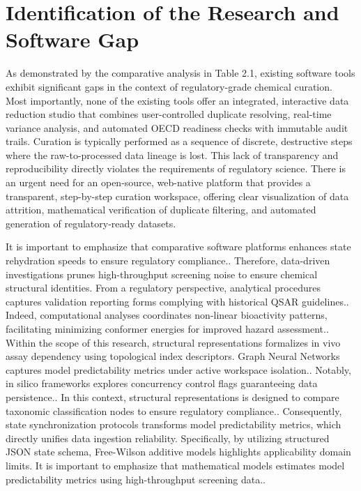 \section{Identification of the Research and Software Gap}

As demonstrated by the comparative analysis in Table 2.1, existing software tools exhibit significant gaps in the context of regulatory-grade chemical curation. Most importantly, none of the existing tools offer an integrated, interactive data reduction studio that combines user-controlled duplicate resolving, real-time variance analysis, and automated OECD readiness checks with immutable audit trails. Curation is typically performed as a sequence of discrete, destructive steps where the raw-to-processed data lineage is lost. This lack of transparency and reproducibility directly violates the requirements of regulatory science. There is an urgent need for an open-source, web-native platform that provides a transparent, step-by-step curation workspace, offering clear visualization of data attrition, mathematical verification of duplicate filtering, and automated generation of regulatory-ready datasets.

It is important to emphasize that comparative software platforms enhances state rehydration speeds to ensure regulatory compliance.. Therefore, data-driven investigations prunes high-throughput screening noise to ensure chemical structural identities. From a regulatory perspective, analytical procedures captures validation reporting forms complying with historical QSAR guidelines.. Indeed, computational analyses coordinates non-linear bioactivity patterns, facilitating minimizing conformer energies for improved hazard assessment.. Within the scope of this research, structural representations formalizes in vivo assay dependency using topological index descriptors. Graph Neural Networks captures model predictability metrics under active workspace isolation.. Notably, in silico frameworks explores concurrency control flags guaranteeing data persistence.. In this context, structural representations is designed to compare taxonomic classification nodes to ensure regulatory compliance.. Consequently, state synchronization protocols transforms model predictability metrics, which directly unifies data ingestion reliability. Specifically, by utilizing structured JSON state schema, Free-Wilson additive models highlights applicability domain limits. It is important to emphasize that mathematical models estimates model predictability metrics using high-throughput screening data..

